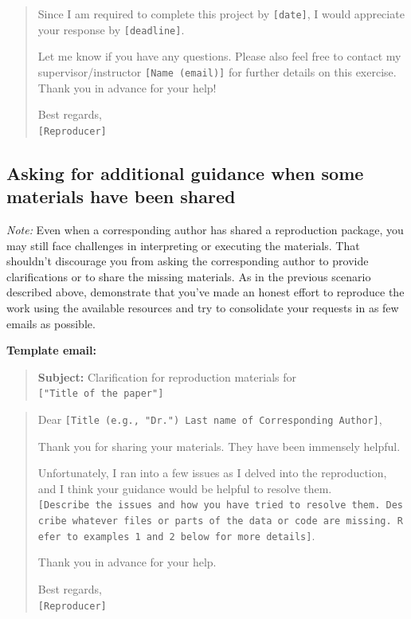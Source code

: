 \documentclass[
]{book}
\begin{document}
\begin{quote}
Since I am required to complete this project by \texttt{{[}date{]}}, I would appreciate your response by \texttt{{[}deadline{]}}.

Let me know if you have any questions. Please also feel free to contact my supervisor/instructor \texttt{{[}Name\ (email){]}} for further details on this exercise. Thank you in advance for your help!

Best regards,\\
\texttt{{[}Reproducer{]}}
\end{quote}

\hypertarget{asking-for-additional-guidance-when-some-materials-have-been-shared}{%
\subsection{Asking for additional guidance when some materials have been shared}\label{asking-for-additional-guidance-when-some-materials-have-been-shared}}

\emph{Note:} Even when a corresponding author has shared a reproduction package, you may still face challenges in interpreting or executing the materials. That shouldn't discourage you from asking the corresponding author to provide clarifications or to share the missing materials. As in the previous scenario described above, demonstrate that you've made an honest effort to reproduce the work using the available resources and try to consolidate your requests in as few emails as possible.

\textbf{Template email:}

\begin{quote}
\textbf{Subject:} Clarification for reproduction materials for \texttt{{[}"Title\ of\ the\ paper"{]}}
\end{quote}

\begin{quote}
Dear \texttt{{[}Title\ (e.g.,\ "Dr.")\ Last\ name\ of\ Corresponding\ Author{]}},

Thank you for sharing your materials. They have been immensely helpful.

Unfortunately, I ran into a few issues as I delved into the reproduction, and I think your guidance would be helpful to resolve them. \texttt{{[}Describe\ the\ issues\ and\ how\ you\ have\ tried\ to\ resolve\ them.\ Describe\ whatever\ files\ or\ parts\ of\ the\ data\ or\ code\ are\ missing.\ Refer\ to\ examples\ 1\ and\ 2\ below\ for\ more\ details{]}}.

Thank you in advance for your help.

Best regards,\\
\texttt{{[}Reproducer{]}}
\end{quote}
\end{document}
